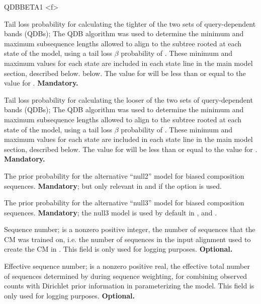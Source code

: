 \begin{sreitems}{QDBBETA1 <f>}
\item [\emprog{QDBBETA1 <f>}] Tail loss probability for calculating
  the tighter of the two sets of query-dependent bands (QDBs); The QDB
  algorithm \citep{NawrockiEddy07} was used to determine the minimum
  and maximum subsequence lengths allowed to align to the subtree
  rooted at each state of the model, using a tail loss $\beta$
  probability of . These minimum and maximum values for each state
  are included in each state line in the main model section, described
  below.  below. The  value for  will be
  less than or equal to the  value for .
  \textbf{Mandatory.}

\item [\emprog{QDBBETA2 <f>}] Tail loss probability for calculating
  the looser of the two sets of query-dependent bands (QDBs); The QDB
  algorithm \citep{NawrockiEddy07} was used to determine the minimum
  and maximum subsequence lengths allowed to align to the subtree
  rooted at each state of the model, using a tail loss $\beta$
  probability of . These minimum and maximum values for each state
  are included in each state line in the main model section, described
  below. The  value for  will be less than
  or equal to the  value for .
  \textbf{Mandatory.}

\item [\emprog{N2OMEGA <f>}] The prior probability for the alternative
  ``null2'' model for biased composition
  sequences. \textbf{Mandatory}; but only relevant in  and
   if the  option is used.

\item [\emprog{N3OMEGA <f>}] The prior probability for the alternative
  ``null3'' model for biased composition
  sequences. \textbf{Mandatory}; the null3 model is used by default in 
  ,  and .

\item [\emprog{NSEQ <d>}] Sequence number;  is a nonzero
positive integer, the number of sequences that the CM was trained on,
i.e. the number of sequences in the input alignment used to create the
CM in .  This field is only used for logging
purposes.  \textbf{Optional.}

\item [\emprog{EFFN <f>}] Effective sequence number;  is a
nonzero positive real, the effective total number of sequences
determined by  during sequence weighting, for combining
observed counts with Dirichlet prior information in parameterizing the
model. This field is only used for logging purposes.
\textbf{Optional.}


\end{sreitems}
